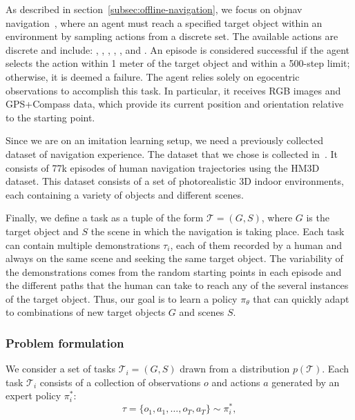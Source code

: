 As described in section~\ref{subsec:offline-navigation}, we focus on \acrshort{objnav} navigation~\cite{batra2020}, where an agent must reach a specified target object within an environment by sampling actions from a discrete set.
The available actions are discrete and include: \turnleft, \turnright, \moveforward, \lookup, \lookdown, and \stopac.
An episode is considered successful if the agent selects the \stopac action within 1 meter of the target object and within a 500-step limit; otherwise, it is deemed a failure.
The agent relies solely on egocentric observations to accomplish this task.
In particular, it receives RGB images and GPS+Compass data, which provide its current position and orientation relative to the starting point.

Since we are on an imitation learning setup, we need a previously collected dataset of navigation experience.
The dataset that we chose is collected in~\cite{ramrakhya2023}.
It consists of 77k episodes of human navigation trajectories using the HM3D~\cite{Ramakrishnan2021HabitatMatterport3D} dataset.
This dataset consists of a set of photorealistic 3D indoor environments, each containing a variety of objects and different scenes.

Finally, we define a task as a tuple of the form $\mathcal{T} = (G, S)$, where $G$ is the target object and $S$ the scene in which the navigation is taking place.
Each task can contain multiple demonstrations $\tau_i$, each of them recorded by a human and always on the same scene and seeking the same target object.
The variability of the demonstrations comes from the random starting points in each episode and the different paths that the human can take to reach any of the several instances of the target object.
Thus, our goal is to learn a policy $\pi_\theta$ that can quickly adapt to combinations of new target objects $G$ and scenes $S$.

\subsubsection{Problem formulation}\label{subsubsec:problem-formulation}

We consider a set of tasks $\mathcal{T}_i = (G, S)$ drawn from a distribution $p(\mathcal{T})$.
Each task $\mathcal{T}_i$ consists of a collection of observations $o$ and actions $a$ generated by an expert policy $\pi^*_i$:
\begin{equation}
    \tau = \{o_1, a_1, \dots, o_T, a_T\} \sim \pi^*_i,
\end{equation}

